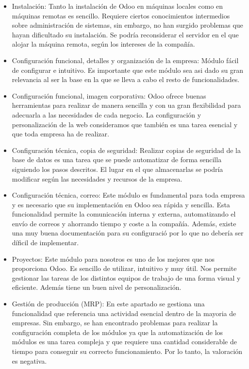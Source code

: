 \begin{itemize}
    \item Instalación: Tanto la instalación de Odoo en máquinas locales como en máquinas remotas es sencillo. Requiere ciertos conocimientos intermedios sobre administración de sistemas, sin embargo, no han surgido problemas que hayan dificultado su instalación. Se podría reconsiderar el servidor en el que alojar la máquina remota, según los intereses de la compañía.
    \item Configuración funcional, detalles y organización de la empresa: Módulo fácil de configurar e intuitivo. Es importante que este módulo sea asi dado  su gran relevancia al ser la base en la que se lleva a cabo el resto de funcionalidades.
    \item Configuración funcional, imagen corporativa: Odoo ofrece buenas herramientas para realizar de manera sencilla y con ua gran flexibilidad para adecuarla a las necesidades de cada negocio. La configuración y personalización de la web consideramos que también es una tarea esencial y que toda empresa ha de realizar.
    \item Configuración técnica, copia de seguridad: Realizar copias de seguridad de la base de datos es una tarea que se puede automatizar de forma sencilla siguiendo los pasos descritos. El lugar en el que almacenarlas se podría modificar según las necesidades y recursos de la empresa.
    \item Configuración técnica, correo: Este módulo es fundamental para toda empresa y es necesario que su implementación en Odoo sea rápida y sencilla. Esta funcionalidad permite la comunicación interna y externa, automatizando el envío de correos y ahorrando tiempo y coste a la compañía. Además, existe una muy buena documentación para su configuració por lo que no debería ser díficil de implementar.
    \item Proyectos: Este módulo para nosotros es uno de los mejores que nos proporciona Odoo. Es sencillo de utilizar, intuitivo y muy útil. Nos permite gestionar las tareas de los distintos equipos de trabajo de una forma visual y eficiente. Además tiene un buen nivel de personalización. 
    \item Gestión de producción (MRP): En este apartado se gestiona una funcionalidad que referencia una actividad esencial dentro de la mayoria de empresas. Sin embargo, se han encontrado problemas para realizar la configuración completa de los módulos ya que la automatización de los módulos es una tarea compleja y que requiere una cantidad considerable de tiempo para conseguir su correcto funcionamiento. Por lo tanto, la valoración es negativa. 

\end{itemize}
